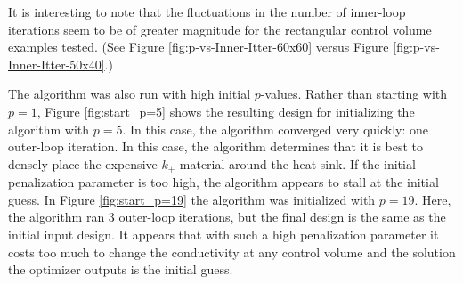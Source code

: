 It is interesting to note that the fluctuations in the number of inner-loop iterations seem to be of greater magnitude for the rectangular control volume examples tested. (See Figure \ref{fig:p-vs-Inner-Itter-60x60} versus Figure \ref{fig:p-vs-Inner-Itter-50x40}.)

The algorithm was also run with high initial $p$-values. Rather than starting with $p=1$, Figure \ref{fig:start_p=5} shows the resulting design for initializing the algorithm with $p=5$. In this case, the algorithm converged very quickly: one outer-loop iteration. In this case, the algorithm determines that it is best to densely place the expensive $k_+$ material around the heat-sink. If the initial penalization parameter is too high, the algorithm appears to stall at the initial guess. In Figure \ref{fig:start_p=19} the algorithm was initialized with $p=19$. Here, the algorithm ran 3 outer-loop iterations, but the final design is the same as the initial input design. It appears that with such a high penalization parameter it costs too much to change the conductivity at any control volume and the solution the optimizer outputs is the initial guess.

